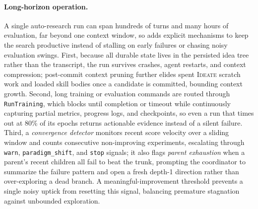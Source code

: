 \paragraph{Long-horizon operation.}
A single auto-research run can span hundreds of turns and many hours of
evaluation, far beyond one context window, so \arbor{} adds explicit mechanisms
to keep the search productive instead of stalling on early failures or chasing
noisy evaluation swings. First, because all durable state lives in the persisted
idea tree rather than the transcript, the run survives crashes, agent restarts,
and context compression; post-commit context pruning further elides spent
\textsc{Ideate} scratch work and loaded skill bodies once a candidate is
committed, bounding context growth. Second, long training or evaluation commands
are routed through \texttt{RunTraining}, which blocks until completion or timeout
while continuously capturing partial metrics, progress logs, and checkpoints, so
even a run that times out at 80\% of its epochs returns actionable evidence
instead of a silent failure. Third, a \emph{convergence detector} monitors
recent score velocity over a sliding window and counts consecutive
non-improving experiments, escalating through \texttt{warn}, \texttt{paradigm\_shift},
and \texttt{stop} signals; it also flags \emph{parent exhaustion} when a parent's
recent children all fail to beat the trunk, prompting the coordinator to
summarize the failure pattern and open a fresh depth-1 direction rather than
over-exploring a dead branch. A meaningful-improvement threshold prevents a
single noisy uptick from resetting this signal, balancing premature stagnation
against unbounded exploration.

